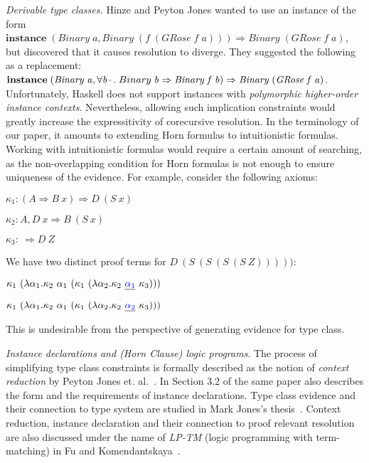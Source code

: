 \documentclass{llncs}
\newcommand{\remph}[1]{\textcolor{blue}{#1}}
\newcommand{\Conid}[1]{\mathit{#1}}
\newcommand{\Varid}[1]{\mathit{#1}}
\newcommand\hsforall{\global\let\hsdot=\hsperiodonce}
\newcommand*\hsperiodonce[2]{#2\global\let\hsdot=\hscompose}
\newcommand*\hscompose[2]{#1}
\begin{document}
\emph{Derivable type classes.} Hinze and Peyton Jones \cite{hinze2001}
wanted to use an instance of the form
\noindent \ensuremath{\mathbf{instance}\;(\Conid{Binary}\;\Varid{a},\Conid{Binary}\;(\Varid{f}\;(\Conid{GRose}\;\Varid{f}\;\Varid{a})))\Rightarrow \Conid{Binary}\;(\Conid{GRose}\;\Varid{f}\;\Varid{a})}, but discovered that it causes resolution to diverge.
They  suggested the following as a replacement:
\noindent \ensuremath{\mathbf{instance}\;(\Conid{Binary}\;\Varid{a},\forall \Varid{b}\hsforall \hsdot{\mathrel{\,\cdot\,}}{\;.\;}\Conid{Binary}\;\Varid{b}\Rightarrow \Conid{Binary}\;\Varid{f}\;\Varid{b})\Rightarrow \Conid{Binary}\;(\Conid{GRose}\;\Varid{f}\;\Varid{a})}. 
Unfortunately, Haskell does not support instances with \textit{polymorphic higher-order instance contexts}.
Nevertheless, allowing such implication constraints  
would greatly increase the expressitivity of corecursive resolution. In the terminology of 
our paper, it amounts to extending Horn formulas to intuitionistic formulas. 
Working with intuitionistic formulas would require a certain amount of searching, 
as the non-overlapping condition for Horn formulas is not enough to ensure uniqueness of 
the evidence. For example, consider the following axioms: 

  \begin{center}
    $\kappa_1 : (A \Rightarrow B\ x) \Rightarrow D\ (S\ x)$

    $\kappa_2 : A, D\ x \Rightarrow B\ (S\ x)$
    
    $\kappa_3 :\ \Rightarrow D\ Z$
  \end{center}





\noindent  We have two distinct proof terms for $D\ (S\ (S\ (S\ (S\ Z)))))$:

\begin{center}
  $\kappa_1\ (\lambda \alpha_1 . \kappa_2\ \alpha_1\ (\kappa_1\ (\lambda \alpha_2
  . \kappa_2\ \underline{\remph{\alpha_1}}\ \kappa_3)))$

  $\kappa_1\ (\lambda \alpha_1 . \kappa_2\ \alpha_1\ (\kappa_1\ (\lambda \alpha_2
  . \kappa_2\ \underline{\remph{\alpha_2}}\ \kappa_3)))$
\end{center}
\noindent This is 
 undesirable from the perspective of generating evidence for type class.  

\emph{Instance declarations and (Horn Clause) logic programs}. The process of simplifying type class
constraints is formally described as the notion of \textit{context reduction}
by Peyton Jones et. al.~\cite{Jones97}. In Section 3.2 of the same paper also
describes the form and the requirements of instance declarations. Type class
evidence and their connection to type system are studied in Mark Jones's
thesis~\cite[Chapter 4.2]{jones2003qualified}. Context reduction,
instance declaration and their connection to proof relevant resolution are also
discussed under the name of \textit{LP-TM} (logic programming with
term-matching) in Fu and Komendantskaya~\cite[Section 4.1]{FuK15}.        
\end{document}
